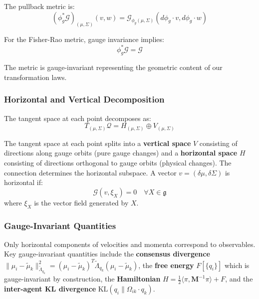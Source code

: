 \documentclass[12pt]{article}
\begin{document}
The pullback metric is:
\begin{equation}
(\phi_g^*\mathcal{G})_{(\mu,\Sigma)}(v, w) = \mathcal{G}_{\phi_g(\mu,\Sigma)}(d\phi_g \cdot v, d\phi_g \cdot w)
\end{equation}

For the Fisher-Rao metric, gauge invariance implies:
\begin{equation}
\boxed{\phi_g^*\mathcal{G} = \mathcal{G}}
\end{equation}

The metric is gauge-invariant representing the geometric content of our transformation laws.

\subsubsection{Horizontal and Vertical Decomposition}

The tangent space at each point decomposes as:
\begin{equation}
T_{(\mu,\Sigma)}\mathcal{Q} = H_{(\mu,\Sigma)} \oplus V_{(\mu,\Sigma)}
\end{equation}

The tangent space at each point splits into a \textbf{vertical space} $V$ consisting of directions along gauge orbits (pure gauge changes) and a \textbf{horizontal space} $H$ consisting of directions orthogonal to gauge orbits (physical changes). The connection determines the horizontal subspace. A vector $v = (\delta\mu, \delta\Sigma)$ is horizontal if:
\begin{equation}
\mathcal{G}(v, \xi_X) = 0 \quad \forall X \in \mathfrak{g}
\end{equation}
where $\xi_X$ is the vector field generated by $X$.

\subsubsection{Gauge-Invariant Quantities}

Only horizontal components of velocities and momenta correspond to observables. Key gauge-invariant quantities include the \textbf{consensus divergence} $\|\mu_i - \tilde{\mu}_k\|_{\tilde{\Lambda}_{q_k}}^2 = (\mu_i - \tilde{\mu}_k)^T\tilde{\Lambda}_{q_k}(\mu_i - \tilde{\mu}_k)$, the \textbf{free energy} $F[\{q_i\}]$ which is gauge-invariant by construction, the \textbf{Hamiltonian} $H = \frac{1}{2}\langle\pi, \mathbf{M}^{-1}\pi\rangle + F$, and the \textbf{inter-agent KL divergence} $\mathrm{KL}(q_i \| \Omega_{ik}\cdot q_k)$.
\end{document}
